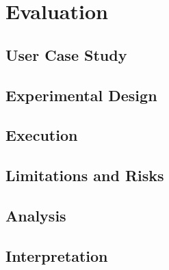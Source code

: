
\chapter{Evaluation}

\ifpdf
    \graphicspath{{Chapters/Evaluation/Figs/}{Chapters/Evaluation/Figs/}{Chapters/Evaluation/Figs/}}
\else
    \graphicspath{{Chapters/Evaluation/Figs/}{Chapters/Evaluation/Figs/}}
\fi

\section{User Case Study}
\label{evaluation:section:casestudy}
\section{Experimental Design}
\label{evaluation:section:design}
\section{Execution}
\label{evaluation:section:execution}
\section{Limitations and Risks}
\label{evaluation:section:risks}
\section{Analysis}
\label{evaluation:section:analysis}
\section{Interpretation}
\label{evaluation:section:interpretation}